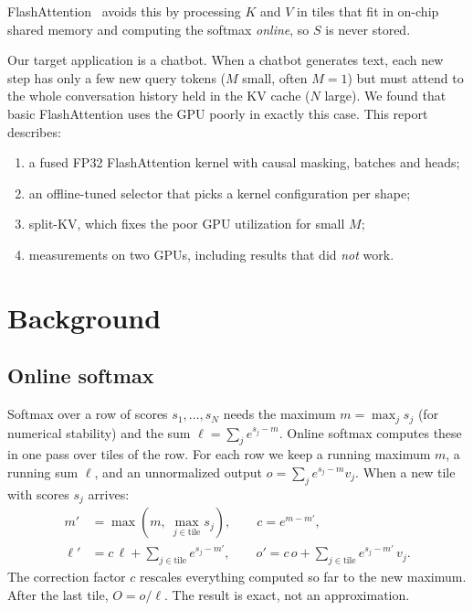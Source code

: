 \documentclass[11pt]{article}
\begin{document}
FlashAttention~\cite{dao2022flashattention,dao2023flashattention2} avoids this
by processing $K$ and $V$ in tiles that fit in on-chip shared memory and
computing the softmax \emph{online}, so $S$ is never stored.

Our target application is a chatbot. When a chatbot generates text, each new
step has only a few new query tokens ($M$ small, often $M=1$) but must attend
to the whole conversation history held in the KV cache ($N$ large). We found
that basic FlashAttention uses the GPU poorly in exactly this case.
This report describes:
\begin{enumerate}
  \item a fused FP32 FlashAttention kernel with causal masking, batches and heads;
  \item an offline-tuned selector that picks a kernel configuration per shape;
  \item split-KV, which fixes the poor GPU utilization for small $M$;
  \item measurements on two GPUs, including results that did \emph{not} work.
\end{enumerate}

\section{Background}

\subsection{Online softmax}
Softmax over a row of scores $s_1,\dots,s_N$ needs the maximum $m=\max_j s_j$
(for numerical stability) and the sum $\ell = \sum_j e^{s_j - m}$.
Online softmax computes these in one pass over tiles of the row.
For each row we keep a running maximum $m$, a running sum $\ell$, and an
unnormalized output $o = \sum_j e^{s_j - m} v_j$. When a new tile with
scores $s_j$ arrives:
\begin{align}
  m' &= \max\!\left(m,\ \max_{j \in \text{tile}} s_j\right), \qquad
  c = e^{m - m'}, \\
  \ell' &= c\,\ell + \sum_{j \in \text{tile}} e^{s_j - m'}, \qquad
  o' = c\,o + \sum_{j \in \text{tile}} e^{s_j - m'}\, v_j .
\end{align}
The correction factor $c$ rescales everything computed so far to the new
maximum. After the last tile, $O = o/\ell$. The result is exact, not an
approximation.
\end{document}
